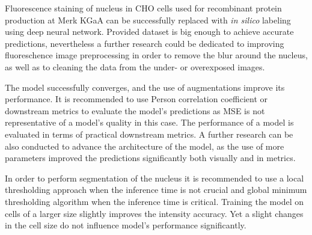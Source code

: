 Fluorescence staining of nucleus in CHO cells used for recombinant protein production at Merk KGaA can be successfully replaced with \textit{in silico} labeling using deep neural network. Provided dataset is big enough to achieve accurate predictions, nevertheless a further research could be dedicated to improving fluoreschence image preprocessing in order to remove the blur around the nucleus, as well as to cleaning the data from the under- or overexposed images. 

The model successfully converges, and the use of augmentations improve its performance. It is recommended to use Person correlation coefficient or downstream metrics to evaluate the model's predictions as MSE is not representative of a model's quality in this case. The performance of a model is evaluated in terms of practical downstream metrics. A further research can be also conducted to advance the architecture of the model, as the use of more parameters improved the predictions significantly both visually and in metrics. 

In order to perform segmentation of the nucleus it is recommended to use a local thresholding approach when the inference time is not crucial and global minimum thresholding algorithm when the inference time is critical. Training the model on cells of a larger size slightly improves the intensity accuracy. Yet a slight changes in the cell size do not influence model's performance significantly.
